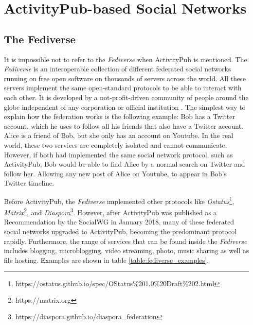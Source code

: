 \section{ActivityPub-based Social Networks}

\subsection{The Fediverse}

It is impossible not to refer to the \emph{Fediverse} when ActivityPub is mentioned. The \emph{Fediverse} is an interoperable collection of different federated social networks running on free open software on thousands of servers across the world. All these servers implement the same open-standard protocols to be able to interact with each other. It is developed by a not-profit-driven community of people around the globe independent of any corporation or official institution \cite{holloway_2018} \cite{https://doi.org/10.48550/arxiv.1909.05801}. The simplest way to explain how the federation works is the following example: Bob has a Twitter account, which he uses to follow all his friends that also have a Twitter account. Alice is a friend of Bob, but she only has an account on Youtube. In the real world, these two services are completely isolated and cannot communicate. However, if both had implemented the same social network protocol, such as ActivityPub, Bob would be able to find Alice by a normal search on Twitter and follow her. Allowing any new post of Alice on Youtube, to appear in Bob's Twitter timeline.

Before ActivityPub, the \emph{Fediverse} implemented other protocols like \emph{Ostatus}\footnote{https://ostatus.github.io/spec/OStatus\%201.0\%20Draft\%202.html}, \emph{Matrix}\footnote{https://matrix.org}, and \emph{Diaspora}\footnote{https://diaspora.github.io/diaspora\_federation}. However, after ActivityPub was published as a Recommendation by the SocialWG in January 2018, many of these federated social networks upgraded to ActivityPub, becoming the predominant protocol rapidly. Furthermore, the range of services that can be found inside the \emph{Fediverse} includes blogging, microblogging, video streaming, photo, music sharing as well as file hosting. Examples are shown in table \ref{table:fediverse_examples}.

